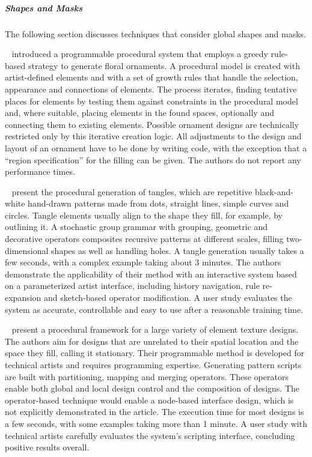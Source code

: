\subparagraph{Shapes and Masks}
\label{subpara:analysis_rulebased_shapes_and_masks}

The following section discusses techniques that consider global shapes and masks.


\citeauthor*{wong_1998_cgf}~\cite{wong_1998_cgf} introduced a programmable procedural system that employs a greedy rule-based strategy to generate floral ornaments. A procedural model is created with artist-defined elements and with a set of growth rules that handle the selection, appearance and connections of elements. The process iterates, finding tentative places for elements by testing them against constraints in the procedural model and, where suitable, placing elements in the found spaces, optionally and connecting them to existing elements. Possible ornament designs are technically restricted only by this iterative creation logic. All adjustments to the design and layout of an ornament have to be done by writing code, with the exception that a ``region specification'' for the filling can be given. The authors do not report any performance times.

\citeauthor*{santoni_2016_ggp}~\cite{santoni_2016_ggp} present the procedural generation of tangles, which are repetitive black-and-white hand-drawn patterns made from dots, straight lines, simple curves and circles. Tangle elements usually align to the shape they fill, for example, by outlining it. A stochastic group grammar with grouping, geometric and decorative operators composites recursive patterns at different scales, filling two-dimensional shapes as well as handling holes. A tangle generation usually takes a few seconds, with a complex example taking about 3 minutes. The authors demonstrate the applicability of their method with an interactive system based on a parameterized artist interface, including history navigation, rule re-expansion and sketch-based operator modification. A user study evaluates the system as accurate, controllable and easy to use after a reasonable training time.

\citeauthor*{loi_2017_pae}~\cite{loi_2017_pae} present a procedural framework for a large variety of element texture designs. The authors aim for designs that are unrelated to their spatial location and the space they fill, calling it stationary. Their programmable method is developed for technical artists and requires programming expertise. Generating pattern scripts are built with partitioning, mapping and merging operators. These operators enable both global and local design control and the composition of designs. The operator-based technique would enable a node-based interface design, which is not explicitly demonstrated in the article. The execution time for most designs is a few seconds, with some examples taking more than 1 minute. A user study with technical artists carefully evaluates the system's scripting interface, concluding positive results overall.


